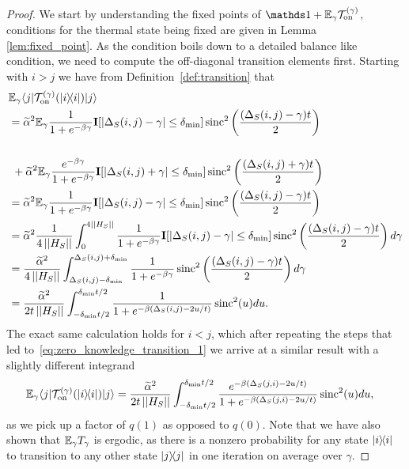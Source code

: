 \begin{proof}
    We start by understanding the fixed points of $\identity + \EE_\gamma \TT_{\on}^{(\gamma)}$, conditions for the thermal state being fixed are given in Lemma \ref{lem:fixed_point}. As the condition boils down to a detailed balance like condition, we need to compute the off-diagonal transition elements first. Starting with $i > j$ we have from Definition~\ref{def:transition} that
    \begin{align}
        &\mathbb{E}_\gamma \langle j| \mathcal{T}_{\rm on}^{(\gamma)}(| i\rangle\! \langle i|)|j\rangle \nonumber \\
        &=  \widetilde{\alpha}^2 \mathbb{E}_{\gamma} \frac{1}{1 + e^{-\beta \gamma}} \mathbf{I}[|\Delta_S(i,j) - \gamma| \le \delta_{\min}]  \operatorname{sinc}^2\left(\frac{(\Delta_S(i,j) - \gamma)t}{2}\right) \\ \nonumber \\
        &~+ \widetilde{\alpha}^2 \mathbb{E}_{\gamma} \frac{e^{-\beta \gamma}}{1 + e^{-\beta \gamma}} \mathbf{I}[|\Delta_S(i,j) + \gamma| \le \delta_{\min}]  \operatorname{sinc}^2\left(\frac{(\Delta_S(i,j) + \gamma)t}{2}\right) \\
        &= \widetilde{\alpha}^2 \mathbb{E}_{\gamma} \frac{1}{1 + e^{-\beta \gamma}} \mathbf{I}[|\Delta_S(i,j) - \gamma| \le \delta_{\min}]  \operatorname{sinc}^2\left(\frac{(\Delta_S(i,j) - \gamma)t}{2}\right) \\
        &= \widetilde{\alpha}^2 \frac{1}{4 \left| \left| H_S \right| \right|} \int_{0}^{4 \left| \left| H_S \right| \right|} \frac{1}{1 + e^{-\beta \gamma}} \mathbf{I}[|\Delta_S(i,j) - \gamma| \le \delta_{\min}]  \operatorname{sinc}^2\left(\frac{(\Delta_S(i,j) - \gamma)t}{2}\right) d\gamma \\
        &=  \frac{\widetilde{\alpha}^2}{4 \left| \left| H_S \right| \right|} \int_{\Delta_S(i,j) - \delta_{\min}}^{\Delta_S(i,j) + \delta_{\min}} \frac{1}{1 + e^{-\beta \gamma}}  \operatorname{sinc}^2\left(\frac{(\Delta_S(i,j) - \gamma)t}{2}\right) d\gamma \\
        &= \frac{\widetilde{\alpha}^2}{2 t \left| \left| H_S \right| \right|} \int_{-\delta_{\min} t /2}^{\delta_{\min} t / 2} \frac{1}{1 + e^{-\beta (\Delta_S(i, j) - 2 u /t)}} \operatorname{sinc}^2(u) du. \label{eq:zero_knowledge_transition_1}
    \end{align}
    The exact same calculation holds for $i < j$, which after repeating the steps that led to~\eqref{eq:zero_knowledge_transition_1} we arrive at a similar result  with a slightly different integrand
    \begin{align}
        \mathbb{E}_\gamma \langle j| \mathcal{T}_{\rm on}^{(\gamma)}(| i\rangle\! \langle i|)|j\rangle &= \frac{\widetilde{\alpha}^2}{2 t \left| \left| H_S \right| \right|} \int_{-\delta_{\min} t /2}^{\delta_{\min} t / 2} \frac{e^{-\beta (\Delta_S(j,i) - 2 u /t)}}{1 + e^{-\beta (\Delta_S(j,i) - 2 u /t)}} \operatorname{sinc}^2(u) du,\label{eq:zero_knowledge_transition_2}
    \end{align}
    as we pick up a factor of $q(1)$ as opposed to $q(0)$. Note that we have also shown that $\mathbb{E}_\gamma T_\gamma$ is ergodic, as there is a nonzero probability for any state $| i\rangle\! \langle i|$ to transition to any other state $| j\rangle\! \langle j|$ in one iteration on average over $\gamma$.


\end{proof}
